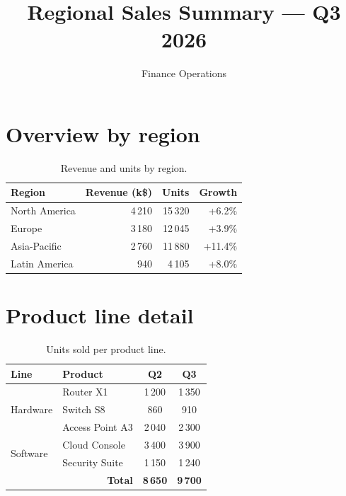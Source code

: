 \documentclass[11pt,a4paper]{article}
\title{Regional Sales Summary --- Q3 2026}
\author{Finance Operations}
\date{}
\begin{document}
\maketitle

\section{Overview by region}

\begin{table}[h]
\centering
\begin{tabular}{l r r r}
\toprule
\textbf{Region} & \textbf{Revenue (k\$)} & \textbf{Units} & \textbf{Growth} \\
\midrule
North America & 4\,210 & 15\,320 & +6.2\% \\
Europe        & 3\,180 & 12\,045 & +3.9\% \\
Asia-Pacific  & 2\,760 & 11\,880 & +11.4\% \\
Latin America & 940    & 4\,105  & +8.0\% \\
\bottomrule
\end{tabular}
\caption{Revenue and units by region.}
\end{table}

\section{Product line detail}

\begin{table}[h]
\centering
\begin{tabular}{|l|l|c|c|}
\hline
\textbf{Line} & \textbf{Product} & \textbf{Q2} & \textbf{Q3} \\ \hline
\multirow{3}{*}{Hardware} & Router X1 & 1\,200 & 1\,350 \\ \cline{2-4}
                          & Switch S8 & 860    & 910 \\ \cline{2-4}
                          & Access Point A3 & 2\,040 & 2\,300 \\ \hline
\multirow{2}{*}{Software} & Cloud Console & 3\,400 & 3\,900 \\ \cline{2-4}
                          & Security Suite & 1\,150 & 1\,240 \\ \hline
\multicolumn{2}{|r|}{\textbf{Total}} & \textbf{8\,650} & \textbf{9\,700} \\ \hline
\end{tabular}
\caption{Units sold per product line.}
\end{table}
\end{document}
